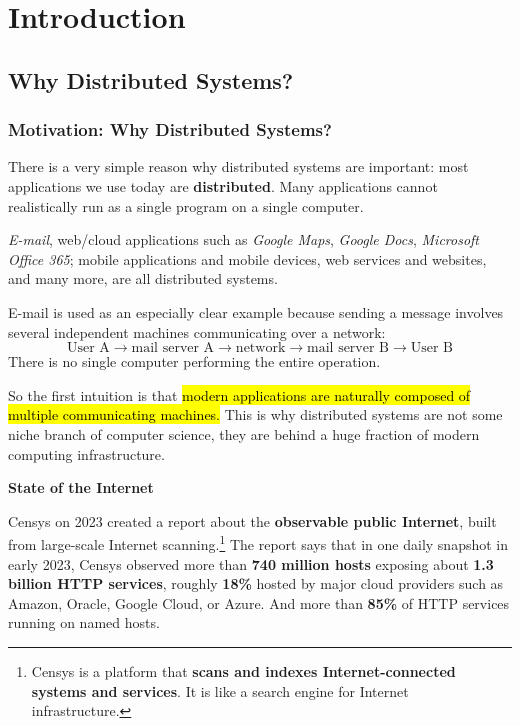 \section{Introduction}\label{sec:introduction}

\subsection{Why Distributed Systems?}\label{subsec:introduction--why-distributed-systems}

\subsubsection{Motivation: Why Distributed Systems?}\label{subsubsec:introduction--why-distributed-systems--motivation-why-distributed-systems}

There is a very simple reason why distributed systems are important: most applications we use today are \textbf{distributed}. Many applications cannot realistically run as a single program on a single computer.

\begin{examplebox}
    \emph{E-mail}, web/cloud applications such as \emph{Google Maps}, \emph{Google Docs}, \emph{Microsoft Office 365}; mobile applications and mobile devices, web services and websites, and many more, are all distributed systems.

    \highspace
    E-mail is used as an especially clear example because sending a message involves several independent machines communicating over a network:
    \begin{equation*}
        \text{User A} \to \text{mail server A} \to \text{network} \to \text{mail server B} \to \text{User B}
    \end{equation*}
    There is no single computer performing the entire operation.
\end{examplebox}

\highspace
So the first intuition is that \hl{modern applications are naturally composed of multiple communicating machines.} This is why distributed systems are not some niche branch of computer science, they are behind a huge fraction of modern computing infrastructure.

\highspace
\begin{flushleft}
    \textcolor{Green3}{ \textbf{State of the Internet}}
\end{flushleft}
Censys on 2023 created a report about the \textbf{observable public Internet}, built from large-scale Internet scanning.\footnote{
    Censys is a platform that \textbf{scans and indexes Internet-connected systems and services}. It is like a search engine for Internet infrastructure.
} The report says that in one daily snapshot in early 2023, Censys observed more than \textbf{740 million hosts} exposing about \textbf{1.3 billion HTTP services}, roughly \textbf{18\%} hosted by major cloud providers such as Amazon, Oracle, Google Cloud, or Azure. And more than \textbf{85\%} of HTTP services running on named hosts.

